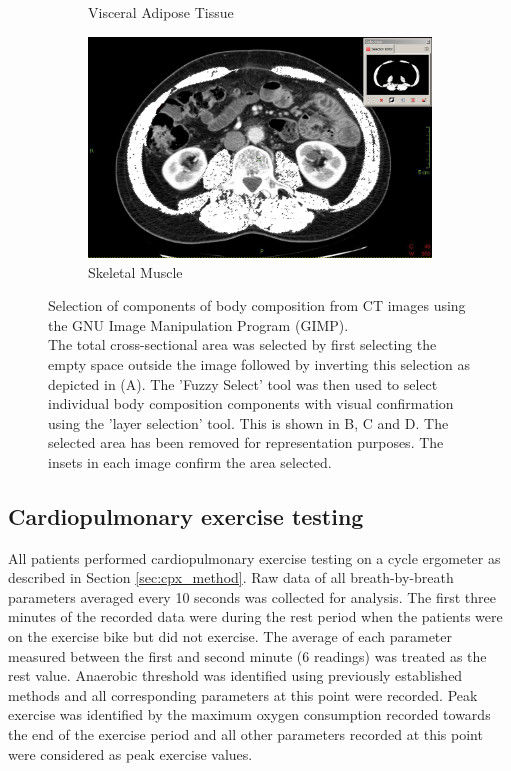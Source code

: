 \begin{figure}[htbp]
\begin{subfigure}{0.45\textwidth}
		\caption{Visceral Adipose Tissue}
		\label{fig:bc_ct_vat}
	\end{subfigure}
	\begin{subfigure}{0.45\textwidth}
		\centering
		\includegraphics[width=\textwidth]{Figures/bc_ct_sm}
		\caption{Skeletal Muscle}
		\label{fig:bc_ct_sm}
	\end{subfigure}
	
	\caption[Selection of components of body composition from CT images using GIMP.]
	{Selection of components of body composition from CT images using the GNU Image Manipulation Program (GIMP).\\ The total cross-sectional area was selected by first selecting the empty space outside the image followed by inverting this selection as depicted in (A). The 'Fuzzy Select' tool was then used to select individual body composition components with visual confirmation using the 'layer selection' tool. This is shown in B, C and D. The selected area has been removed for representation purposes. The insets in each image confirm the area selected.}
	\label{fig:bc_ct_gimp}
\end{figure}

\subsection{Cardiopulmonary exercise testing}
All patients performed cardiopulmonary exercise testing on a cycle ergometer as described in Section \ref{sec:cpx_method}. 
Raw data of all breath-by-breath parameters averaged every 10 seconds was collected for analysis. 
The first three minutes of the recorded data were during the rest period when the patients were on the exercise bike but did not exercise. 
The average of each parameter measured between the first and second minute (6 readings) was treated as the rest value. 
Anaerobic threshold was identified using previously established methods \parencite{beaver_new_1986,sue_metabolic_1988} and all corresponding parameters at this point were recorded. 
Peak exercise was identified by the maximum oxygen consumption recorded towards the end of the exercise period and all other parameters recorded at this point were considered as peak exercise values.

